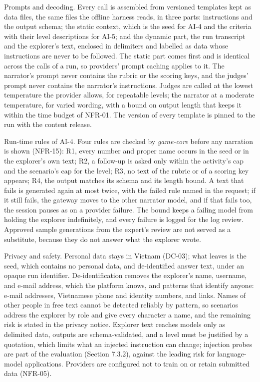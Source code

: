 Prompts and decoding. Every call is assembled from versioned templates kept as data files, the same files the offline harness reads, in three parts: instructions and the output schema; the static context, which is the seed for AI-4 and the criteria with their level descriptions for AI-5; and the dynamic part, the run transcript and the explorer's text, enclosed in delimiters and labelled as data whose instructions are never to be followed. The static part comes first and is identical across the calls of a run, so providers' prompt caching applies to it. The narrator's prompt never contains the rubric or the scoring keys, and the judges' prompt never contains the narrator's instructions. Judges are called at the lowest temperature the provider allows, for repeatable levels; the narrator at a moderate temperature, for varied wording, with a bound on output length that keeps it within the time budget of NFR-01. The version of every template is pinned to the run with the content release.

Run-time rules of AI-4. Four rules are checked by \textit{game-core} before any narration is shown (NFR-15): R1, every number and proper name occurs in the seed or in the explorer's own text; R2, a follow-up is asked only within the activity's cap and the scenario's cap for the level; R3, no text of the rubric or of a scoring key appears; R4, the output matches its schema and its length bound. A text that fails is generated again at most twice, with the failed rule named in the request; if it still fails, the gateway moves to the other narrator model, and if that fails too, the session pauses as on a provider failure. The bound keeps a failing model from holding the explorer indefinitely, and every failure is logged for the log review. Approved sample generations from the expert's review are not served as a substitute, because they do not answer what the explorer wrote.

Privacy and safety. Personal data stays in Vietnam (DC-03); what leaves is the seed, which contains no personal data, and de-identified answer text, under an opaque run identifier. De-identification removes the explorer's name, username, and e-mail address, which the platform knows, and patterns that identify anyone: e-mail addresses, Vietnamese phone and identity numbers, and links. Names of other people in free text cannot be detected reliably by pattern, so scenarios address the explorer by role and give every character a name, and the remaining risk is stated in the privacy notice. Explorer text reaches models only as delimited data, outputs are schema-validated, and a level must be justified by a quotation, which limits what an injected instruction can change; injection probes are part of the evaluation (Section 7.3.2), against the leading risk for language-model applications\cite{r166}. Providers are configured not to train on or retain submitted data (NFR-05).

